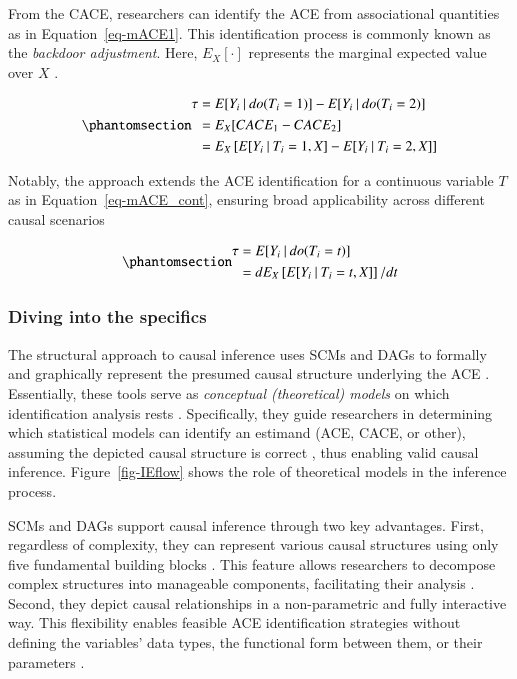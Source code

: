 \documentclass[
  authoryear,
  review,
  1p]{elsarticle}
\begin{document}
From the CACE, researchers can identify the ACE from associational
quantities as in Equation~\ref{eq-mACE1}. This identification process is
commonly known as the \emph{backdoor adjustment}. Here, \(E_{X}[\cdot]\)
represents the marginal expected value over \(X\)
\citep{Morgan_et_al_2014}.

\begin{equation}\phantomsection\label{eq-mACE1}{
\begin{aligned}
  \tau & = E[Y_{i} \:|\:do(T_{i}=1)]- E[Y_{i} \:|\:do(T_{i}=2)] \\
  & = E_{X}[CACE_{1} - CACE_{2}] \\
  & = E_{X}\left[ E[Y_{i} \:|\:T_{i}=1, X] - E[Y_{i} \:|\:T_{i}=2, X] \right]
\end{aligned}
}\end{equation}

Notably, the approach extends the ACE identification for a continuous
variable \(T\) as in Equation~\ref{eq-mACE_cont}, ensuring broad
applicability across different causal scenarios
\citep[pp.~45]{Neal_2020}

\begin{equation}\phantomsection\label{eq-mACE_cont}{
\begin{aligned}
  \tau &= E[Y_{i} \:|\:do(T_{i}=t)] \\
  & = d E_{X}\left[ E[Y_{i} \:|\:T_{i}=t, X]\right]/ dt
  \end{aligned}
}\end{equation}

\subsubsection{Diving into the specifics}\label{sec-appendix-B2}

The structural approach to causal inference uses SCMs and DAGs to
formally and graphically represent the presumed causal structure
underlying the ACE
\citep{Pearl_2009, Pearl_et_al_2016, Gross_et_al_2018, Neal_2020}.
Essentially, these tools serve as \emph{conceptual (theoretical) models}
on which identification analysis rests
\citep[pp.~4]{Schuessler_et_al_2023}. Specifically, they guide
researchers in determining which statistical models can identify an
estimand (ACE, CACE, or other), assuming the depicted causal structure
is correct \citep{McElreath_2020}, thus enabling valid causal inference.
Figure~\ref{fig-IEflow} shows the role of theoretical models in the
inference process.

SCMs and DAGs support causal inference through two key advantages.
First, regardless of complexity, they can represent various causal
structures using only five fundamental building blocks
\citep{Neal_2020, McElreath_2020}. This feature allows researchers to
decompose complex structures into manageable components, facilitating
their analysis \citep{McElreath_2020}. Second, they depict causal
relationships in a non-parametric and fully interactive way. This
flexibility enables feasible ACE identification strategies without
defining the variables' data types, the functional form between them, or
their parameters \citep[pp.~35]{Pearl_et_al_2016}.
\end{document}
